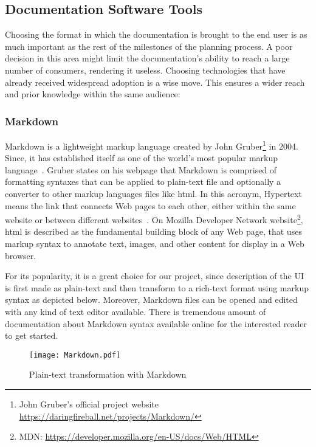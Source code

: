 \subsection{Documentation Software Tools}

Choosing the format in which the documentation is brought to the end user is as much important as the rest of the milestones of the planning process. A poor decision in this area might limit the documentation's ability to reach a large number of consumers, rendering it useless. Choosing technologies that have already received widespread adoption is a wise move. This ensures a wider reach and prior knowledge within the same audience:

\subsubsection{Markdown}\label{sec:MD}

Markdown is a lightweight markup language created by John Gruber\footnote{John Gruber's official project website \url{https://daringfireball.net/projects/Markdown/}} in 2004. Since, it has established itself as one of the world's most popular markup language~\cite{Markdown}. Gruber states on his webpage that Markdown is comprised of formatting syntaxes that can be applied to plain-text file and optionally a converter to other markup languages files like \gls{html}. In this acronym, Hypertext means the link that connects Web pages to each other, either within the same website or between different websites~\cite{mozillaMDN}. On Mozilla Developer Network website\footnote{MDN: \url{https://developer.mozilla.org/en-US/docs/Web/HTML}}, \gls*{html} is described as the fundamental building block of any Web page, that uses markup syntax to annotate text, images, and other content for display in a Web browser.

For its popularity, it is a great choice for our project, since description of the UI is first made as plain-text and then transform to a rich-text format using markup syntax as depicted below. Moreover, Markdown files can be opened and edited with any kind of text editor available. There is tremendous amount of documentation about Markdown syntax available online for the interested reader to get started.

\begin{figure}[h]
    \centering
    \texttt{[image: Markdown.pdf]}
    \caption{Plain-text transformation with Markdown}
    \label{fig:Markdown}
\end{figure}

